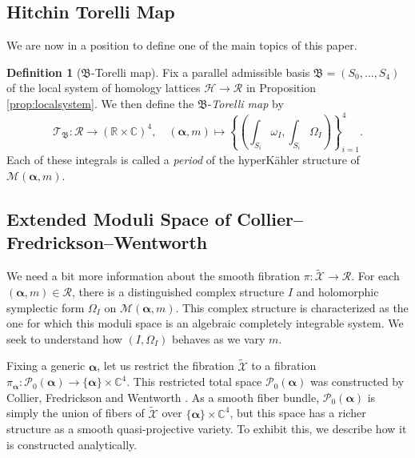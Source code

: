 \documentclass[12pt,letterpaper,reqno]{amsart}
\def\mathbf#1{#1}%
\theoremstyle{remark}
\theoremstyle{definition}
\newtheorem{rem}[thm]{Remark}
\newtheorem{defn}[thm]{Definition}
\numberwithin{thm}{section}
\numberwithin{equation}{section}
\numberwithin{figure}{section}
\newcommand{\R}{\ensuremath{\mathbb R}}
\newcommand{\C}{\ensuremath{\mathbb C}}
\newcommand{\calP}{\mathcal P}
\newcommand{\calR}{\mathcal R}
\newcommand{\calM}{\mathcal M}
\newcommand{\frakB}{\mathfrak B}
\newcommand{\calX}{\ensuremath{\mathcal X}}
\newcommand{\bsa}{\boldsymbol{\alpha}}
\newcommand{\bfm}{\mathbf{m}}
\begin{document}
\subsection{Hitchin Torelli Map}

We are now in a position to define one of the main topics of this paper.
\begin{defn}[$\mathfrak{B}$-Torelli map]\label{def:Torelli}
Fix a parallel admissible basis $\mathfrak{B} = (S_0, \ldots, S_4)$ of the local system of homology lattices $\mathcal{H} \to \mathcal{R}$ in Proposition \ref{prop:localsystem}. We then define the $\frakB$-\emph{Torelli map} by
\[
\mathcal{T}_{\frakB} : \calR \longrightarrow ( \R \times \C)^4, \quad (\boldsymbol{\alpha}, \mathbf{m}) \longmapsto \left\{\left( \int_{S_i} \omega_I, \int_{S_i} \Omega_I \right)\right\}_{i=1}^4.  
\]
Each of these integrals is called a \emph{period} of the hyperK\"ahler structure of $\calM(\bsa,\bfm)$. 
\end{defn}
 


\subsection{Extended Moduli Space of Collier--Fredrickson--Wentworth}\label{sec:CFW}
We need a bit more information about the smooth fibration $\pi: \widetilde{\calX} \to \calR$.  For each $(\bsa,\bfm) \in \calR$, there is
a distinguished complex structure $I$ and holomorphic symplectic form $\Omega_I$ on $\calM(\bsa,\bfm)$. This complex structure is
characterized as the one for which this moduli space is an algebraic completely integrable system.
We seek to understand how $(I, \Omega_I)$ behaves as we vary $\mathbf{m}$.  

Fixing a generic $\bsa$, let us restrict the fibration $\widetilde{\calX}$ to a fibration $\pi_{\bsa}: \mathcal{P}_0(\bsa) \to \{\bsa\} \times \C^4$. This restricted
total space $\mathcal{P}_0(\bsa)$ was constructed by Collier, Fredrickson and Wentworth \cite{collier2024conformallimitsparabolicslnchiggs}.
As a smooth fiber bundle, $\calP_0(\bsa)$ is simply the union of fibers of $\widetilde{\calX}$ over $\{\bsa\} \times \C^4$, but this space has a richer structure 
as a smooth quasi-projective variety. To exhibit this, we describe how it is constructed analytically.
\end{document}

